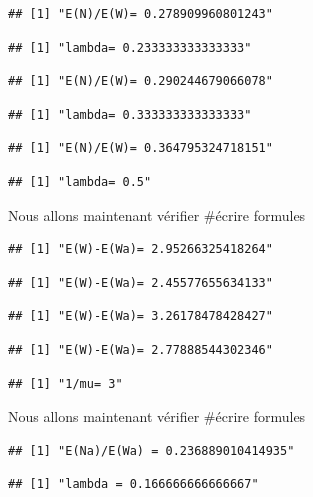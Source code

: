 \documentclass[
]{article}
\begin{document}
\begin{verbatim}
## [1] "E(N)/E(W)= 0.278909960801243"
\end{verbatim}

\begin{verbatim}
## [1] "lambda= 0.233333333333333"
\end{verbatim}

\begin{verbatim}
## [1] "E(N)/E(W)= 0.290244679066078"
\end{verbatim}

\begin{verbatim}
## [1] "lambda= 0.333333333333333"
\end{verbatim}

\begin{verbatim}
## [1] "E(N)/E(W)= 0.364795324718151"
\end{verbatim}

\begin{verbatim}
## [1] "lambda= 0.5"
\end{verbatim}

Nous allons maintenant vérifier \#écrire formules

\begin{verbatim}
## [1] "E(W)-E(Wa)= 2.95266325418264"
\end{verbatim}

\begin{verbatim}
## [1] "E(W)-E(Wa)= 2.45577655634133"
\end{verbatim}

\begin{verbatim}
## [1] "E(W)-E(Wa)= 3.26178478428427"
\end{verbatim}

\begin{verbatim}
## [1] "E(W)-E(Wa)= 2.77888544302346"
\end{verbatim}

\begin{verbatim}
## [1] "1/mu= 3"
\end{verbatim}

Nous allons maintenant vérifier \#écrire formules

\begin{verbatim}
## [1] "E(Na)/E(Wa) = 0.236889010414935"
\end{verbatim}

\begin{verbatim}
## [1] "lambda = 0.166666666666667"
\end{verbatim}
\end{document}
